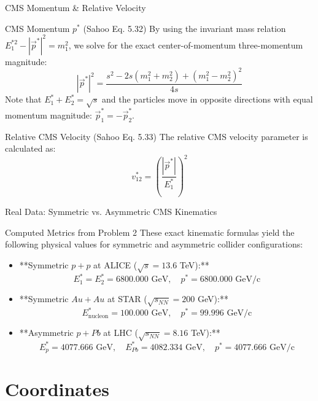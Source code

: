 \documentclass[aspectratio=169]{beamer}
\begin{document}
\begin{frame}{CMS Momentum \& Relative Velocity}
    \begin{block}{CMS Momentum $p^*$ (Sahoo Eq. 5.32)}
        By using the invariant mass relation $E_1^{*2} - |\vec{p}^*|^2 = m_1^2$, we solve for the exact center-of-momentum three-momentum magnitude:
        \[ |\vec{p}^*|^2 = \frac{s^2 - 2s(m_1^2 + m_2^2) + (m_1^2 - m_2^2)^2}{4s} \]
        Note that $E_1^* + E_2^* = \sqrt{s}$ and the particles move in opposite directions with equal momentum magnitude: $\vec{p}_1^* = -\vec{p}_2^*$.
    \end{block}
    \begin{block}{Relative CMS Velocity (Sahoo Eq. 5.33)}
        The relative CMS velocity parameter is calculated as:
        \[ v_{12}^* = \left( \frac{|\vec{p}^*|}{E_1^*} \right)^2 \]
    \end{block}
\end{frame}

\begin{frame}{Real Data: Symmetric vs. Asymmetric CMS Kinematics}
    \begin{block}{Computed Metrics from Problem 2}
        These exact kinematic formulas yield the following physical values for symmetric and asymmetric collider configurations:
    \end{block}
    \begin{itemize}
        \item **Symmetric $p+p$ at ALICE ($\sqrt{s} = 13.6$ TeV):**
        \[ E_1^* = E_2^* = 6800.000\text{ GeV}, \quad p^* = 6800.000\text{ GeV/c} \]
        \item **Symmetric $Au+Au$ at STAR ($\sqrt{s_{NN}} = 200$ GeV):**
        \[ E_{\text{nucleon}}^* = 100.000\text{ GeV}, \quad p^* = 99.996\text{ GeV/c} \]
        \item **Asymmetric $p+Pb$ at LHC ($\sqrt{s_{NN}} = 8.16$ TeV):**
        \[ E_p^* = 4077.666\text{ GeV}, \quad E_{Pb}^* = 4082.334\text{ GeV}, \quad p^* = 4077.666\text{ GeV/c} \]
    \end{itemize}
\end{frame}

\section{Coordinates}
\end{document}
